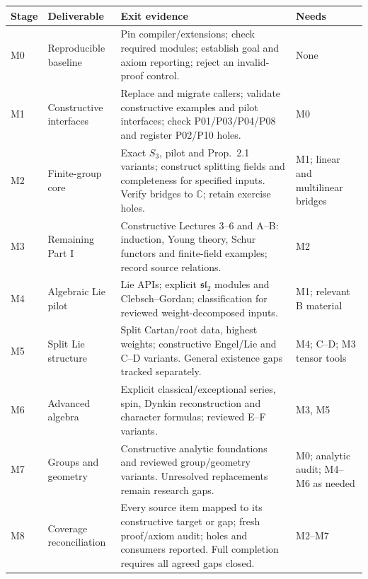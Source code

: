 \documentclass[11pt,a4paper]{article}
\newcommand{\code}[1]{\texttt{\detokenize{#1}}}
\newcommand{\C}{\mathbb C}
\newcommand{\slie}{\mathfrak{sl}}
\begin{document}
{\small
\begin{tabularx}{\linewidth}{@{}P{10mm}P{28mm}YP{27mm}@{}}
\toprule
Stage & Deliverable & Exit evidence & Needs \\
\midrule
M0 & Reproducible baseline & Pin compiler/extensions; check required modules; establish goal and axiom reporting; reject an invalid-proof control. & None \\
M1 & Constructive interfaces & Replace \code{IsIrreducible} and migrate callers; validate constructive examples and pilot interfaces; check P01/P03/P04/P08 and register P02/P10 holes. & M0 \\
M2 & Finite-group core & Exact $S_3$, pilot and Prop.\ 2.1 variants; construct splitting fields and completeness for specified inputs. Verify bridges to $\C$; retain exercise holes. & M1; linear and multilinear bridges \\
M3 & Remaining Part I & Constructive Lectures 3--6 and A--B: induction, Young theory, Schur functors and finite-field examples; record source relations. & M2 \\
M4 & Algebraic Lie pilot & Lie APIs; explicit $\slie_2$ modules and Clebsch--Gordan; classification for reviewed weight-decomposed inputs. & M1; relevant B material \\
M5 & Split Lie structure & Split Cartan/root data, highest weights; constructive Engel/Lie and C--D variants. General existence gaps tracked separately. & M4; C--D; M3 tensor tools \\
M6 & Advanced algebra & Explicit classical/exceptional series, spin, Dynkin reconstruction and character formulas; reviewed E--F variants. & M3, M5 \\
M7 & Groups and geometry & Constructive analytic foundations and reviewed group/geometry variants. Unresolved replacements remain research gaps. & M0; analytic audit; M4--M6 as needed \\
M8 & Coverage reconciliation & Every source item mapped to its constructive target or gap; fresh proof/axiom audit; holes and consumers reported. Full completion requires all agreed gaps closed. & M2--M7 \\
\bottomrule
\end{tabularx}}
\end{document}
